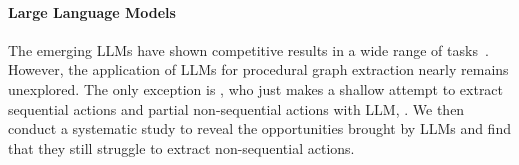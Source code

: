 \paragraph{Large Language Models}
The emerging LLMs have shown competitive results in a wide range of tasks~\cite{zhao2023survey, min2023recent}. 
However, the application of LLMs for procedural graph extraction nearly remains unexplored. 
The only exception is \citet{bellan2022leveraging}, who just makes a shallow attempt to extract sequential actions and partial non-sequential actions with LLM, . 
 We then conduct a systematic study to reveal the opportunities brought by LLMs and find that they still struggle to extract non-sequential actions. 



